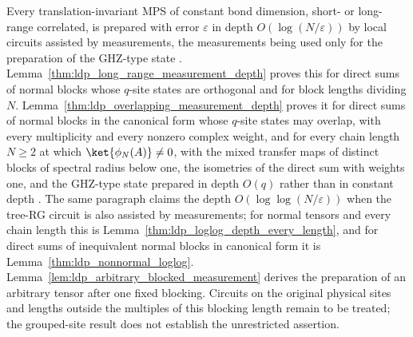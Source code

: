 \begin{theorem}
    \label{thm:ldp_all_ti_measurement_source}
    Every translation-invariant MPS of constant bond dimension, short- or
    long-range correlated, is prepared with error $\varepsilon$ in depth
    $O(\log(N/\varepsilon))$ by local circuits assisted by measurements, the
    measurements being used only for the preparation of the GHZ-type state
    \cite[paragraph ``Long-range MPS using measurements'']{Malz2024Preparation}.
    Lemma~\ref{thm:ldp_long_range_measurement_depth} proves this for direct
    sums of normal blocks whose $q$-site states are orthogonal and for block
    lengths dividing $N$. Lemma~\ref{thm:ldp_overlapping_measurement_depth}
    proves it for direct sums of normal blocks in the canonical form
    \cite[eq.~(S2)]{Malz2024Preparation} whose $q$-site states may overlap,
    with every multiplicity and every nonzero complex weight, and for every
    chain length $N\geq2$ at which $\ket{\phi_N(A)}\neq0$, with the mixed
    transfer maps of distinct blocks of spectral radius below one, the
    isometries of the direct sum with weights one, and the GHZ-type state
    prepared in depth $O(q)$ rather than in constant depth
    \cite{gap:mswc24_measurement_preparation_scope}. The same paragraph claims
    the depth $O(\log\log(N/\varepsilon))$ when the tree-RG circuit is also
    assisted by measurements; for normal tensors and every chain length this is
    Lemma~\ref{thm:ldp_loglog_depth_every_length}, and for direct sums of
    inequivalent normal blocks in canonical form it is
    Lemma~\ref{thm:ldp_nonnormal_loglog}.
    Lemma~\ref{lem:ldp_arbitrary_blocked_measurement} derives the
    preparation of an arbitrary tensor after one fixed blocking. Circuits on
    the original physical sites and lengths outside the multiples of this
    blocking length remain to be treated; the grouped-site result does not
    establish the unrestricted assertion.
\end{theorem}
